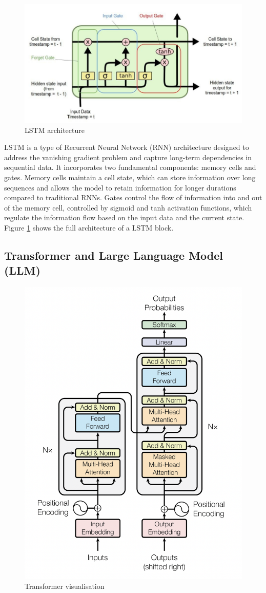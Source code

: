 \begin{figure}[htbp]
    \centering
    \includegraphics[width=0.8\linewidth]{images/lstm.jpeg}
    \caption{LSTM architecture \cite{rahman-2023-lstm-networks}}
    \label{fig:lstm}
\end{figure}

LSTM \cite{hochreiter-1997-lstm} is a type of Recurrent Neural Network (RNN) architecture designed to address the vanishing gradient problem and capture long-term dependencies in sequential data. It incorporates two fundamental components: memory cells and gates. Memory cells maintain a cell state, which can store information over long sequences and allows the model to retain information for longer durations compared to traditional RNNs. Gates control the flow of information into and out of the memory cell, controlled by sigmoid and tanh activation functions, which regulate the information flow based on the input data and the current state. Figure \ref{fig:lstm} shows the full architecture of a LSTM block.

\subsection{Transformer and Large Language Model (LLM)}

\begin{figure}[htbp]
    \centering
    \includegraphics[width=0.65\linewidth]{images/transformer.png}
    \caption{Transformer visualisation \cite{vaswani-2023-attention}}
    \label{fig:transformer}
\end{figure}


